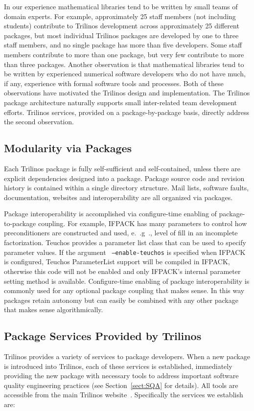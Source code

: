 \documentclass[12pt,relax]{TPA}
\begin{document}
In our experience mathematical libraries tend to be written by small
teams of domain experts.  For example, approximately 25 staff
members (not including students) contribute to Trilinos development 
across approximately 25
different packages, but most individual Trilinos packages
are developed by one to three staff members, and no single package 
has more than five
developers.   Some staff members contribute to more than one package,
but very few contribute to more than three packages.  Another
observation is that mathematical libraries tend to be written
by experienced numerical software
developers who do not have much, if any, experience with formal
software tools and processes.  Both of these observations have
motivated the Trilinos design and implementation.  The Trilinos
package architecture naturally supports small inter-related team
development efforts. Trilinos services, provided on a
package-by-package basis, directly address the second observation.

\subsection{Modularity via Packages}
Each Trilinos package is fully self-sufficient and self-contained,
unless there are explicit dependencies designed into a package.
Package source code and revision history is contained within a single directory
structure.  Mail lists, software faults, documentation, websites and
interoperability are all organized via packages.  

Package
interoperability is accomplished via configure-time enabling of
package-to-package coupling.  For example, IFPACK has many parameters
to control how preconditioners are constructed and used, e.~.g~.,
level of fill in an incomplete factorization.  Teuchos provides a
parameter list class that can be used to specify parameter values.
If the argument {\tt
--enable-teuchos} is specified when IFPACK is configured, Teuchos
ParameterList support will be compiled in IFPACK, otherwise this code
will not be enabled and only IFPACK's internal parameter setting
method is available.  Configure-time enabling of package
interoperability is commonly used for any optional package coupling
that makes sense.  In this way packages retain autonomy but can easily
be combined with any other package that makes sense algorithmically. 
 
\subsection{Package Services Provided by Trilinos}
Trilinos provides a variety of services to package
developers.  When a new package is introduced into Trilinos, each of
these services is established, immediately providing the new package
with necessary tools to address important software quality engineering
practices (see Section~\ref{sect:SQA} for details).  All tools are 
accessible from the main Trilinos website~\cite{Trilinos-home-page}.
Specifically the services we establish are: 
\end{document}
